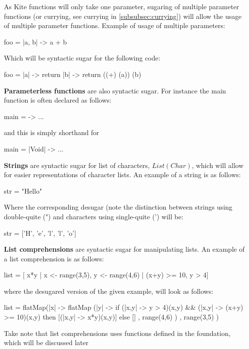 As Kite functions will only take one parameter, sugaring of multiple
parameter functions (or currying, see currying in \ref{subsubsec:currying})
will allow the usage of multiple parameter functions. Example of usage
of multiple parameters:
\begin{kite}
  
  foo = |a, b| -> {
    a + b
  }
\end{kite}

Which will be syntactic sugar for the following code:
\begin{kite}

  foo = |a| -> {
    return |b| -> {
      return ((+) (a)) (b)
    }
  }
\end{kite}

\textbf{Parameterless functions} are also syntactic sugar. For instance the main function is often declared as follows:

\begin{kite}

main = -> 
{
  ...
}
\end{kite}

and this is simply shorthand for

\begin{kite}

main = |Void| -> 
{
  ...
}
\end{kite}

\textbf{Strings} are syntactic sugar for list of characters, $List(Char)$,
which will allow for easier representations of character lists. An
example of a string is as follows:
\begin{kite}
  
  str = "Hello"
\end{kite}

Where the corresponding desugar (note the distinction between strings
using double-quite (") and characters using single-quite (') will be:
\begin{kite}
  
  str = ['H', 'e', 'l', 'l', 'o']
\end{kite}


\label{sec:ex-listcomp}
\textbf{List comprehensions} are syntactic sugar for manipulating
lists. An example of a list comprehension is as follows:
\begin{kite}
  
  list = [ x*y | x <- range(3,5), y <- range(4,6) | (x+y) >= 10, y > 4]
\end{kite}
where the desugared version of the given example, will look as follows:
\begin{kite}

  list =
  flatMap(|x| -> {
    flatMap (|y| -> {
      if (|x,y| -> {y > 4})(x,y) && (|x,y| -> {(x+y) >= 10})(x,y) 
         then [(|x,y| -> {x*y})(x,y)] 
         else []
    } , range(4,6) )
}, range(3,5) )
\end{kite}
Take note that list comprehensions uses functions defined in the
foundation, which will be discussed later

